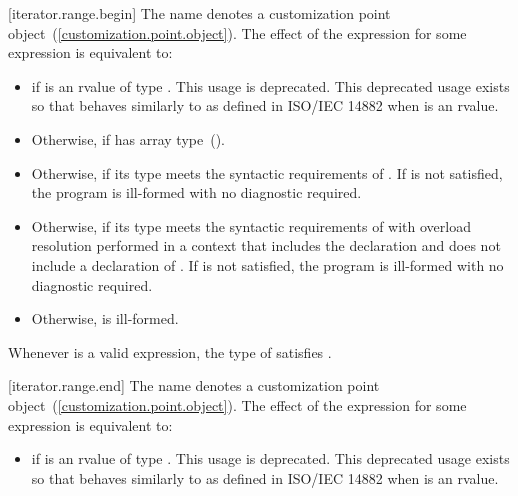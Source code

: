 \begin{addedblock}
[iterator.range.begin]{}
\pnum
The name  denotes a customization point
 object~(\ref{customization.point.object}). The effect of the expression
 for some expression  is equivalent to:

\begin{itemize}
\item
   if  is an rvalue of
  type . This usage is deprecated.
  \enternote This deprecated usage exists so that
   behaves similarly to 
  as defined in ISO/IEC 14882 when  is an rvalue. \exitnote

\item
  Otherwise,  if  has array
  type~().

\item
  Otherwise,  if its type  meets the
  syntactic requirements of . If
   is not satisfied, the program is ill-formed
  with no diagnostic required.

\item
  Otherwise,  if its type  meets the
  syntactic requirements of  with overload
  resolution performed in a context that includes the declaration
   and does not include
  a declaration of . If 
  is not satisfied, the program is ill-formed with no diagnostic
  required.

\item
  Otherwise,  is ill-formed.
\end{itemize}

\pnum
\remark Whenever  is a valid expression, the
type of  satisfies .

[iterator.range.end]{}
\pnum
The name  denotes a customization point
object~(\ref{customization.point.object}). The effect of the expression
 for some expression  is equivalent to:

\begin{itemize}
\item
   if  is an rvalue of
  type . This usage is deprecated.
  \enternote This deprecated usage exists so that
   behaves similarly to 
  as defined in ISO/IEC 14882 when  is an rvalue. \exitnote


\end{itemize}
\end{addedblock}
